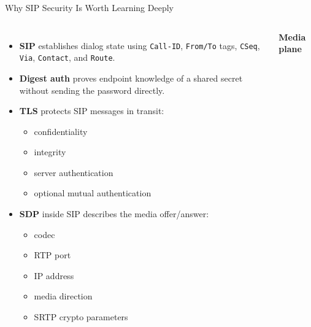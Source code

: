 \documentclass[aspectratio=169]{beamer}
\begin{document}
\begin{frame}{Why SIP Security Is Worth Learning Deeply}
\begin{columns}[T]
\begin{itemize}
    \item \textbf{SIP} establishes dialog state using \texttt{Call-ID}, \texttt{From/To} tags, \texttt{CSeq}, \texttt{Via}, \texttt{Contact}, and \texttt{Route}.
    \item \textbf{Digest auth} proves endpoint knowledge of a shared secret without sending the password directly.
    \item \textbf{TLS} protects SIP messages in transit:
    \begin{itemize}
        \tiny
        \item confidentiality
        \item integrity
        \item server authentication
        \item optional mutual authentication
    \end{itemize}
    \item \textbf{SDP} inside SIP describes the media offer/answer:
    \begin{itemize}
        \tiny
        \item codec
        \item RTP port
        \item IP address
        \item media direction
        \item SRTP crypto parameters
    \end{itemize}
\end{itemize}


\textbf{Media plane}

\vspace{0.05cm}


\end{columns}
\end{frame}
\end{document}
